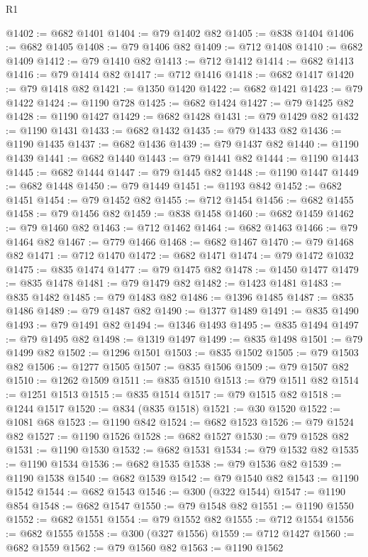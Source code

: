 \begin{lexlean}{R1}
\begin{coremodule}
@1402 := @682 @1401
@1404 := @79 @1402 @82
@1405 := @838 @1404
@1406 := @682 @1405
@1408 := @79 @1406 @82
@1409 := @712 @1408
@1410 := @682 @1409
@1412 := @79 @1410 @82
@1413 := @712 @1412
@1414 := @682 @1413
@1416 := @79 @1414 @82
@1417 := @712 @1416
@1418 := @682 @1417
@1420 := @79 @1418 @82
@1421 := @1350 @1420
@1422 := @682 @1421
@1423 := @79 @1422
@1424 := @1190 @728
@1425 := @682 @1424
@1427 := @79 @1425 @82
@1428 := @1190 @1427
@1429 := @682 @1428
@1431 := @79 @1429 @82
@1432 := @1190 @1431
@1433 := @682 @1432
@1435 := @79 @1433 @82
@1436 := @1190 @1435
@1437 := @682 @1436
@1439 := @79 @1437 @82
@1440 := @1190 @1439
@1441 := @682 @1440
@1443 := @79 @1441 @82
@1444 := @1190 @1443
@1445 := @682 @1444
@1447 := @79 @1445 @82
@1448 := @1190 @1447
@1449 := @682 @1448
@1450 := @79 @1449
@1451 := @1193 @842
@1452 := @682 @1451
@1454 := @79 @1452 @82
@1455 := @712 @1454
@1456 := @682 @1455
@1458 := @79 @1456 @82
@1459 := @838 @1458
@1460 := @682 @1459
@1462 := @79 @1460 @82
@1463 := @712 @1462
@1464 := @682 @1463
@1466 := @79 @1464 @82
@1467 := @779 @1466
@1468 := @682 @1467
@1470 := @79 @1468 @82
@1471 := @712 @1470
@1472 := @682 @1471
@1474 := @79 @1472 @1032
@1475 := @835 @1474
@1477 := @79 @1475 @82
@1478 := @1450 @1477
@1479 := @835 @1478
@1481 := @79 @1479 @82
@1482 := @1423 @1481
@1483 := @835 @1482
@1485 := @79 @1483 @82
@1486 := @1396 @1485
@1487 := @835 @1486
@1489 := @79 @1487 @82
@1490 := @1377 @1489
@1491 := @835 @1490
@1493 := @79 @1491 @82
@1494 := @1346 @1493
@1495 := @835 @1494
@1497 := @79 @1495 @82
@1498 := @1319 @1497
@1499 := @835 @1498
@1501 := @79 @1499 @82
@1502 := @1296 @1501
@1503 := @835 @1502
@1505 := @79 @1503 @82
@1506 := @1277 @1505
@1507 := @835 @1506
@1509 := @79 @1507 @82
@1510 := @1262 @1509
@1511 := @835 @1510
@1513 := @79 @1511 @82
@1514 := @1251 @1513
@1515 := @835 @1514
@1517 := @79 @1515 @82
@1518 := @1244 @1517
@1520 := @834 (@835 @1518)
@1521 := @30 @1520
@1522 := @1081 @68
@1523 := @1190 @842
@1524 := @682 @1523
@1526 := @79 @1524 @82
@1527 := @1190 @1526
@1528 := @682 @1527
@1530 := @79 @1528 @82
@1531 := @1190 @1530
@1532 := @682 @1531
@1534 := @79 @1532 @82
@1535 := @1190 @1534
@1536 := @682 @1535
@1538 := @79 @1536 @82
@1539 := @1190 @1538
@1540 := @682 @1539
@1542 := @79 @1540 @82
@1543 := @1190 @1542
@1544 := @682 @1543
@1546 := @300 (@322 @1544)
@1547 := @1190 @854
@1548 := @682 @1547
@1550 := @79 @1548 @82
@1551 := @1190 @1550
@1552 := @682 @1551
@1554 := @79 @1552 @82
@1555 := @712 @1554
@1556 := @682 @1555
@1558 := @300 (@327 @1556)
@1559 := @712 @1427
@1560 := @682 @1559
@1562 := @79 @1560 @82
@1563 := @1190 @1562

\end{coremodule}
\end{lexlean}
